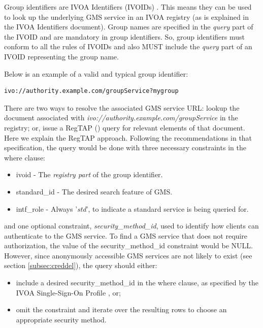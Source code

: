 \documentclass[11pt,a4paper]{ivoa}
\begin{document}
Group identifiers are IVOA Identifiers (IVOIDs) \citep{2016ivoa.spec.0523D}.  This means they can be used to look up the underlying GMS service in an IVOA registry (as is explained in the IVOA Identifiers document).  Group names are specified in the \emph{query} part of the IVOID and are mandatory in group identifiers.  So, group identifiers must conform to all the rules of IVOIDs and also MUST include the \emph{query} part of an IVOID representing the group name.

Below is an example of a valid and typical group identifier:

\begin{verbatim}
ivo://authority.example.com/groupService?mygroup
\end{verbatim}

There are two ways to resolve the associated GMS service URL:  lookup the document associated with \emph{ivo://authority.example.com/groupService} in the registry; or, issue a RegTAP (\citep{2014ivoa.spec.1208D}) query for relevant elements of that document.  Here we explain the RegTAP approach.  Following the recommendations in that specification, the query would be done with three necessary constraints in the where clause:
\begin{itemize}
\item{ivoid} - The \emph{registry part} of the group identifier.
\item{standard\_id} - The desired search feature of GMS.
\item{intf\_role} - Always '\emph{std}', to indicate a standard service is being queried for.
\end{itemize}

and one optional constraint, \emph{security\_method\_id}, used to identify how clients can authenticate to the GMS service.  To find a GMS service that does not require authorization, the value of the security\_method\_id constraint would be NULL.  However, since anonymously accessible GMS services are not likely to exist (see section \ref{subsec:creddel}), the query should either:

\begin{itemize}
\item include a desired security\_method\_id in the where clause, as specified by the IVOA Single-Sign-On Profile \citep{2017ivoa.spec.0524T}, or;
\item omit the constraint and iterate over the resulting rows to choose an appropriate security method.
\end{itemize}
\end{document}
